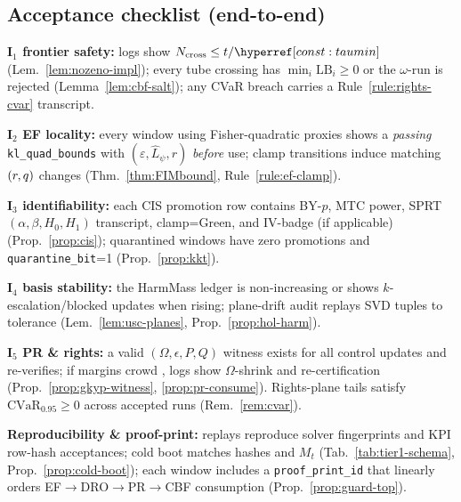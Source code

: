 \subsection{Acceptance checklist (end-to-end)}\label{subsec:concl-accept}
\begin{acceptchecks}
\item \textbf{I\(_1\) frontier safety:} logs show $N_{\mathrm{cross}}\le t/\constref{taumin}$ (Lem.~\ref{lem:nozeno-impl}); every tube crossing has $\min_i \mathrm{LB}_i\ge0$ or the $\omega$-run is rejected (Lemma~\ref{lem:cbf-salt}); any CVaR breach carries a Rule~\ref{rule:rights-cvar} transcript.
\item \textbf{I\(_2\) EF locality:} every window using Fisher-quadratic proxies shows a \emph{passing} \texttt{kl\_quad\_bounds} with $(\varepsilon,\hat L_\psi,r)$ \emph{before} use; clamp transitions induce matching $(r,q)$ changes (Thm.~\ref{thm:FIMbound}, Rule~\ref{rule:ef-clamp}).
\item \textbf{I\(_3\) identifiability:} each CIS promotion row contains BY-$p$, MTC power, SPRT $(\alpha,\beta,H_0,H_1)$ transcript, clamp=Green, and IV-badge (if applicable) (Prop.~\ref{prop:cis}); quarantined windows have zero promotions and \texttt{quarantine\_bit}=1 (Prop.~\ref{prop:kkt}).
\item \textbf{I\(_4\) basis stability:} the HarmMass ledger is non-increasing or shows $k$-escalation/blocked updates when rising; plane-drift audit replays SVD tuples to tolerance (Lem.~\ref{lem:usc-planes}, Prop.~\ref{prop:hol-harm}).
\item \textbf{I\(_5\) PR \& rights:} a valid $(\Omega,\epsilon,P,Q)$ witness exists for all control updates and re-verifies; if margins crowd \constsymPRmargin, logs show $\Omega$-shrink and re-certification (Prop.~\ref{prop:gkyp-witness}, \ref{prop:pr-consume}). Rights-plane tails satisfy $\mathrm{CVaR}_{0.95}\ge0$ across accepted runs (Rem.~\ref{rem:cvar}).
\item \textbf{Reproducibility \& proof-print:} replays reproduce solver fingerprints and KPI row-hash acceptances; cold boot matches hashes and $M_t$ (Tab.~\ref{tab:tier1-schema}, Prop.~\ref{prop:cold-boot}); each window includes a \texttt{proof\_print\_id} that linearly orders EF$\rightarrow$DRO$\rightarrow$PR$\rightarrow$CBF consumption (Prop.~\ref{prop:guard-top}).
\end{acceptchecks}
